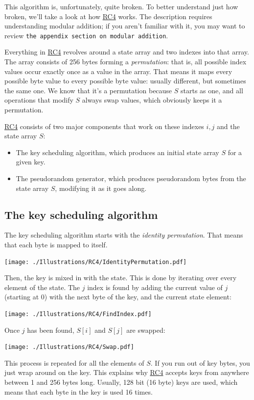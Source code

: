 \documentclass[11pt,ebook,table,dvipsnames]{memoir}
\begin{document}
This algorithm is, unfortunately, quite broken. To better understand
just how broken, we'll take a look at how \hyperref[RC4]{RC4} works. The description
requires understanding modular addition; if you aren't familiar with
it, you may want to review \texttt{the appendix section on modular addition}.

Everything in \hyperref[RC4]{RC4} revolves around a state array and two indexes into
that array. The array consists of 256 bytes forming a \emph{permutation}:
that is, all possible index values occur exactly once as a value in
the array. That means it maps every possible byte value to every
possible byte value: usually different, but sometimes the same one. We
know that it's a permutation because $S$ starts as one, and all
operations that modify $S$ always swap values, which obviously keeps
it a permutation.

\hyperref[RC4]{RC4} consists of two major components that work on these indexes $i, j$
and the state array $S$:

\begin{itemize}
\item The key scheduling algorithm, which produces an initial state array
$S$ for a given key.
\item The pseudorandom generator, which produces pseudorandom bytes from
the state array $S$, modifying it as it goes along.
\end{itemize}

\subsection{The key scheduling algorithm}
\label{sec-2-3-9-1}

The key scheduling algorithm starts with the \emph{identity permutation}.
That means that each byte is mapped to itself.

\texttt{[image: ./Illustrations/RC4/IdentityPermutation.pdf]}

Then, the key is mixed in with the state. This is done by iterating
over every element of the state. The $j$ index is found by adding the
current value of $j$ (starting at 0) with the next byte of the key,
and the current state element:

\texttt{[image: ./Illustrations/RC4/FindIndex.pdf]}

Once $j$ has been found, $S[i]$ and $S[j]$ are swapped:

\texttt{[image: ./Illustrations/RC4/Swap.pdf]}

This process is repeated for all the elements of $S$. If you run out
of key bytes, you just wrap around on the key. This explains why \hyperref[RC4]{RC4}
accepts keys from anywhere between 1 and 256 bytes long. Usually, 128
bit (16 byte) keys are used, which means that each byte in the key is
used 16 times.
\end{document}
